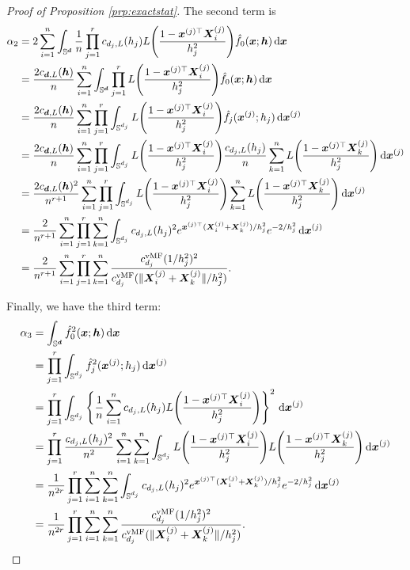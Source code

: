 \documentclass[oneside,11pt]{article}
\begin{document}
\begin{proof}[Proof of Proposition \ref{prp:exactstat}]
The second term is
\begin{align*}
    \alpha_2 &= 2 \sum_{i=1}^{n} \int_{\mathbb{S}^{\boldsymbol{d}}} \frac{1}{n} \prod_{j=1}^{r} c_{d_j,L}(h_j)L \Bigg( \frac{1 - \boldsymbol{x}^{(j)\top} \boldsymbol{X}_i^{(j)}}{h_j^2} \Bigg) \hat{f}_{0}(\boldsymbol{x};{\boldsymbol{h}}) \,\mathrm{d} \boldsymbol{x} \\
    &= \frac{2 c_{\boldsymbol{d},L}({\boldsymbol{h}})}{n} \sum_{i=1}^{n} \int_{\mathbb{S}^{\boldsymbol{d}}} \prod_{j=1}^{r} L \Bigg( \frac{1 - \boldsymbol{x}^{(j)\top} \boldsymbol{X}_i^{(j)}}{h_j^2} \Bigg) \hat{f}_{0}(\boldsymbol{x};{\boldsymbol{h}}) \,\mathrm{d} \boldsymbol{x} \\
    &= \frac{2 c_{\boldsymbol{d},L}({\boldsymbol{h}})}{n} \sum_{i=1}^{n} \prod_{j=1}^{r} \int_{\mathbb{S}^{d_j}} L \Bigg( \frac{1 - \boldsymbol{x}^{(j)\top} \boldsymbol{X}_i^{(j)}}{h_j^2} \Bigg) \hat{f}_{j}(\boldsymbol{x}^{(j)};h_j) \,\mathrm{d} \boldsymbol{x}^{(j)} \\
    &= \frac{2 c_{\boldsymbol{d},L}({\boldsymbol{h}})}{n} \sum_{i=1}^{n} \prod_{j=1}^{r} \int_{\mathbb{S}^{d_j}} L \Bigg( \frac{1 - \boldsymbol{x}^{(j)\top} \boldsymbol{X}_i^{(j)}}{h_j^2} \Bigg) \frac{c_{d_j,L}(h_j)}{n} \sum_{k=1}^{n} L \Bigg( \frac{1 - \boldsymbol{x}^{(j)\top} \boldsymbol{X}_k^{(j)}}{h_j^2} \Bigg)\,\mathrm{d} \boldsymbol{x}^{(j)} \\
    &= \frac{2 c_{\boldsymbol{d},L}({\boldsymbol{h}})^2}{n^{r+1}} \sum_{i=1}^{n} \prod_{j=1}^{r} \int_{\mathbb{S}^{d_j}} L \Bigg( \frac{1 - \boldsymbol{x}^{(j)\top} \boldsymbol{X}_i^{(j)}}{h_j^2} \Bigg) \sum_{k=1}^{n} L \Bigg( \frac{1 - \boldsymbol{x}^{(j)\top} \boldsymbol{X}_k^{(j)}}{h_j^2} \Bigg)\,\mathrm{d} \boldsymbol{x}^{(j)} \\
    &= \frac{2}{n^{r+1}} \sum_{i=1}^{n} \prod_{j=1}^{r} \sum_{k=1}^{n} \int_{\mathbb{S}^{d_j}} c_{d_j,L}(h_j)^2 e^{\boldsymbol{x}^{(j) \top} (\boldsymbol{X}_i^{(j)} + \boldsymbol{X}_k^{(j)})/h_j^2} e^{-2/h_j^2} \,\mathrm{d} \boldsymbol{x}^{(j)} \\
    &= \frac{2}{n^{r+1}} \sum_{i=1}^{n} \prod_{j=1}^{r} \sum_{k=1}^{n} \frac{c_{d_j}^\mathrm{vMF}(1/h_j^2)^2}{c_{d_j}^\mathrm{vMF}(\|\boldsymbol{X}_i^{(j)} + \boldsymbol{X}_k^{(j)}\|/h_j^2)}.
\end{align*}

Finally, we have the third term:
\begin{align*}
    \alpha_3 &= \int_{\mathbb{S}^{\boldsymbol{d}}} \hat{f}_{0}^2(\boldsymbol{x};{\boldsymbol{h}}) \,\mathrm{d} \boldsymbol{x} \\
    &= \prod_{j=1}^{r} \int_{\mathbb{S}^{d_j}} \hat{f}_{j}^2(\boldsymbol{x}^{(j)};h_j) \,\mathrm{d} \boldsymbol{x}^{(j)} \\
    &= \prod_{j=1}^{r} \int_{\mathbb{S}^{d_j}} \left\{\frac{1}{n} \sum_{i=1}^{n} c_{d_j,L}(h_j) L \Bigg( \frac{1 - \boldsymbol{x}^{(j)\top} \boldsymbol{X}_i^{(j)}}{h_j^2} \Bigg)\right\}^2 \,\mathrm{d} \boldsymbol{x}^{(j)} \\
    &= \prod_{j=1}^{r} \frac{c_{d_j,L}(h_j)^2}{n^2} \sum_{i=1}^{n} \sum_{k=1}^{n} \int_{\mathbb{S}^{d_j}} L \Bigg( \frac{1 - \boldsymbol{x}^{(j)\top} \boldsymbol{X}_i^{(j)}}{h_j^2} \Bigg) L \Bigg( \frac{1 - \boldsymbol{x}^{(j)\top} \boldsymbol{X}_k^{(j)}}{h_j^2} \Bigg) \,\mathrm{d} \boldsymbol{x}^{(j)} \\
    &= \frac{1}{n^{2r}} \prod_{j=1}^{r} \sum_{i=1}^{n} \sum_{k=1}^{n} \int_{\mathbb{S}^{d_j}} c_{d_j,L}(h_j)^2  e^{\boldsymbol{x}^{(j) \top} (\boldsymbol{X}_i^{(j)} + \boldsymbol{X}_k^{(j)})/h_j^2} e^{-2/h_j^2} \,\mathrm{d} \boldsymbol{x}^{(j)} \\
    &= \frac{1}{n^{2r}} \prod_{j=1}^{r} \sum_{i=1}^{n} \sum_{k=1}^{n} \frac{c_{d_j}^\mathrm{vMF}(1/h_j^2)^2}{c_{d_j}^\mathrm{vMF}(\|\boldsymbol{X}_i^{(j)} + \boldsymbol{X}_k^{(j)}\|/h_j^2)}.
\end{align*}


\end{proof}
\end{document}
